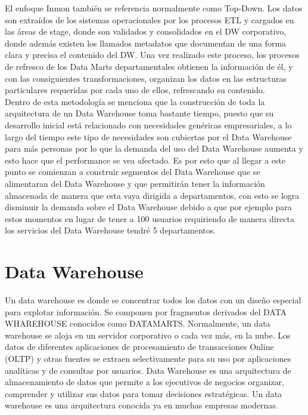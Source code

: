 El enfoque Inmon también se referencia normalmente como Top-Down. Los datos son extraídos de los sistemas operacionales por los procesos ETL y cargados en las áreas de stage, donde son validados y consolidados en el DW corporativo, donde además existen los llamados metadatos que documentan de una forma clara y precisa el contenido del DW. Una vez realizado este proceso, los procesos de refresco de los Data Marts departamentales obtienen la información de él, y con las consiguientes transformaciones, organizan los datos en las estructuras particulares requeridas por cada uno de ellos, refrescando su contenido.\\
Dentro de esta metodología se menciona que la construcción de toda la arquitectura de un Data Warehouse toma bastante tiempo, puesto que su desarrollo inicial está relacionado con necesidades genéricas empresariales, a lo largo del tiempo este tipo de necesidades son cubiertas por el Data Warehouse para más personas por lo que la demanda del uso del Data Warehouse aumenta y esto hace que el performance se vea afectado. Es por esto que al llegar a este punto se comienzan a construir segmentos del Data Warehouse que se alimentaran del Data Warehouse y que permitirán tener la información almacenada de manera que esta vaya dirigida a departamentos, con esto se logra disminuir la demanda sobre el Data Warehouse debido a que por ejemplo para estos momentos en lugar de tener a 100 usuarios requiriendo de manera directa los servicios del Data Warehouse tendré 5 departamentos.

\section{Data Warehouse}
Un data warehouse es donde se concentrar todos los datos con un diseño especial para explotar información. Se componen por fragmentos derivados del DATA WHAREHOUSE conocidos como DATAMARTS.
Normalmente, un data warehouse se aloja en un servidor corporativo o cada vez más, en la nube. Los datos de diferentes aplicaciones de procesamiento de transacciones Online (OLTP) y otras fuentes se extraen selectivamente para su uso por aplicaciones analíticas y de consultas por usuarios.
Data Warehouse es una arquitectura de almacenamiento de datos que permite a los ejecutivos de negocios organizar, comprender y utilizar sus datos para tomar decisiones estratégicas. Un data warehouse es una arquitectura conocida ya en muchas empresas modernas.
 
